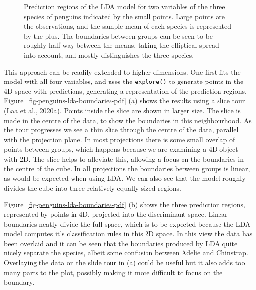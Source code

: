 \documentclass[
  letterpaper,
]{krantz}
\begin{document}
\begin{figure}[H]


\caption{\label{fig-lda-2D-boundary}Prediction regions of the LDA model
for two variables of the three species of penguins indicated by the
small points. Large points are the observations, and the sample mean of
each species is represented by the plus. The boundaries between groups
can be seen to be roughly half-way between the means, taking the
elliptical spread into account, and mostly distinguishes the three
species.}

\end{figure}%

 

This approach can be readily extended to higher dimensions. One first
fits the model with all four variables, and uses the \texttt{explore()}
to generate points in the 4D space with predictions, generating a
representation of the prediction regions.
Figure~\ref{fig-penguins-lda-boundaries-pdf} (a) shows the results using
a slice tour (Laa et al., 2020a). Points inside the slice are shown in
larger size. The slice is made in the centre of the data, to show the
boundaries in this neighbourhood. As the tour progresses we see a thin
slice through the centre of the data, parallel with the projection
plane. In most projections there is some small overlap of points between
groups, which happens because we are examining a 4D object with 2D. The
slice helps to alleviate this, allowing a focus on the boundaries in the
centre of the cube. In all projections the boundaries between groups is
linear, as would be expected when using LDA. We can also see that the
model roughly divides the cube into three relatively equally-sized
regions.

Figure~\ref{fig-penguins-lda-boundaries-pdf} (b) shows the three
prediction regions, represented by points in 4D, projected into the
discriminant space. Linear boundaries neatly divide the full space,
which is to be expected because the LDA model computes it's
classification rules in this 2D space. In this view the data has been
overlaid and it can be seen that the boundaries produced by LDA quite
nicely separate the species, albeit some confusion between Adelie and
Chinstrap. Overlaying the data on the slide tour in (a) could be useful
but it also adds too many parts to the plot, possibly making it more
difficult to focus on the boundary.
\end{document}
